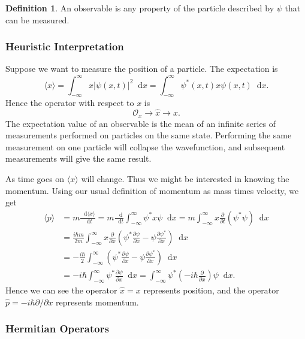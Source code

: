 \documentclass[12pt]{article}
\newcommand{\diff}{\mathop{}\!\mathrm{d}}
\theoremstyle{definition}
\newtheorem{definition}{Definition}[section]
\theoremstyle{remark}
\begin{document}
\begin{definition}
	An observable is any property of the particle described by $\psi$ that can be measured.
\end{definition}

\subsubsection{Heuristic Interpretation}%
\label{subsub:heuristic_interpretation}

Suppose we want to measure the position of a particle. The expectation is
\[
	\langle x \rangle = \int_{-\infty}^{\infty}x |\psi(x, t)|^2\diff x = \int_{-\infty}^{\infty}\psi^{\ast}(x, t) x \psi(x, t)\diff x
.\]
Hence the operator with respect to $x$ is
\[
\mathcal{O}_x \to \hat x \to x
.\]
The expectation value of an observable is the mean of an infinite series of measurements performed on particles on the same state. Performing the same measurement on one particle will collapse the wavefunction, and subsequent measurements will give the same result.

As time goes on $\langle x \rangle$ will change. Thus we might be interested in knowing the momentum. Using our usual definition of momentum as mass times velocity, we get
\begin{align*}
	\langle p \rangle &= m \frac{\diff \langle x \rangle}{\diff t} = m \frac{\diff}{\diff t} \int_{-\infty}^{\infty} \psi^{\ast} x \psi \diff x = m \int_{-\infty}^{\infty} x \frac{\partial}{\partial t}(\psi^{\ast} \psi)\diff x \\
			  &= \frac{i \hbar m}{2m}\int_{-\infty}^{\infty} x \frac{\partial}{\partial x}\left(\psi^{\ast} \frac{\partial \psi}{\partial x} - \psi \frac{\partial \psi^{\ast}}{\partial x}\right) \diff x \\
			  &= - \frac{i \hbar}{2} \int_{-\infty}^{\infty} \left( \psi^{\ast} \frac{\partial \psi}{\partial x} - \psi \frac{\partial \psi^{\ast}}{\partial x} \right) \diff x \\
			  &= - i \hbar \int_{-\infty}^{\infty} \psi^{\ast} \frac{\partial \psi}{\partial x}\diff x = \int_{-\infty}^{\infty} \psi^{\ast} \left(-i\hbar \frac{\partial}{\partial x} \right)\psi \diff x.
\end{align*}
Hence we can see the operator $\hat x = x$ represents position, and the operator $\hat p = - i \hbar \partial/\partial x$ represents momentum.

\subsubsection{Hermitian Operators}%
\label{subsub:hermitian_operators}
\end{document}
